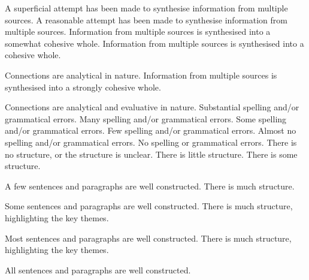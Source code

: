 \documentclass{../../fal_assignment}
\begin{document}
\begin{markingrubric}
	\grade		A superficial attempt has been made to synthesise information from multiple sources.
	\grade		A reasonable attempt has been made to synthesise information from multiple sources.
	\grade		Information from multiple sources is synthesised into a somewhat cohesive whole.
	\grade		Information from multiple sources is synthesised into a cohesive whole.
	\par		Connections are analytical in nature.
	\grade		Information from multiple sources is synthesised into a strongly cohesive whole.
	\par		Connections are analytical and evaluative in nature.
	\grade\fail 	Substantial spelling and/or grammatical errors.
	\grade 		Many spelling and/or grammatical errors.
	\grade 		Some spelling and/or grammatical errors.  
	\grade 		Few spelling and/or grammatical errors.
	\grade 		Almost no spelling and/or grammatical errors.
	\grade 		No spelling or grammatical errors.
	\grade\fail 	There is no structure, or the structure is unclear.
	\grade 		There is little structure.
	\grade 		There is some structure.
	\par 		A few sentences and paragraphs are well constructed.
	\grade 		There is much structure.
	\par 		Some sentences and paragraphs are well constructed.
	\grade 		There is much structure, highlighting the key themes.
	\par 		Most sentences and paragraphs are well constructed.
	\grade 		There is much structure, highlighting the key themes.
	\par 		All sentences and paragraphs are well constructed.
\end{markingrubric}
\end{document}
